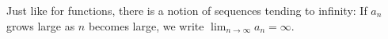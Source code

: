 \begin{frame}
Just like for functions, there is a notion of sequences tending to infinity:  If $a_n$ grows large as $n$ becomes large, we write $\lim_{n\to\infty}a_n = \infty$.

%
\end{frame}
